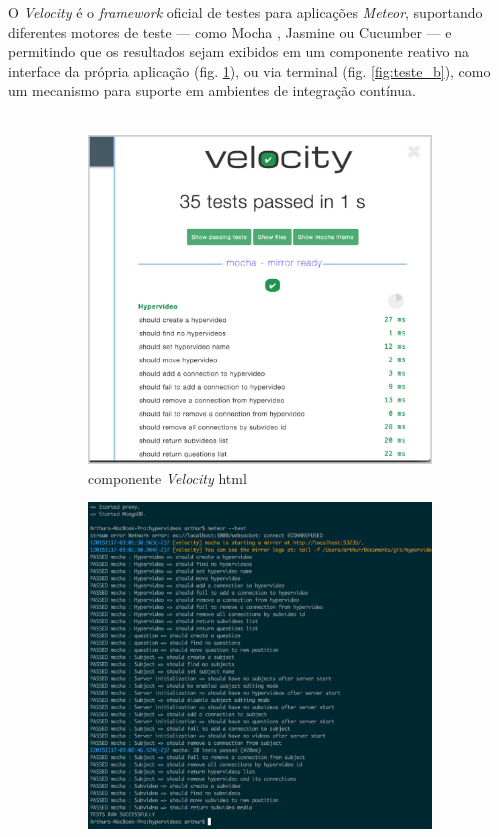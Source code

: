 O \textit{Velocity} é o \textit{framework} oficial de testes para aplicações \textit{Meteor}, suportando diferentes motores de teste --- como Mocha \cite{mocha2015}, Jasmine \cite{jasmine2015} ou Cucumber \cite{cucumber2015} --- e permitindo que os resultados sejam exibidos em um componente reativo na interface da própria aplicação (fig. \ref{fig:teste_a}), ou via terminal (fig. \ref{fig:teste_b}), como um mecanismo para suporte em ambientes de integração contínua.
\\
\\
\begin{figure}[h!]
	\centering
	\begin{subfigure}{.45\textwidth}
  		\centering
  		\includegraphics[width=.95\linewidth]{figuras/teste_a.eps}
  		\caption{componente \textit{Velocity} html}
  		\label{fig:teste_a}
	\end{subfigure}%
	\begin{subfigure}{.45\textwidth}
  		\centering
  		\includegraphics[width=.95\linewidth]{figuras/teste_b.eps}

\end{subfigure}
\end{figure}

